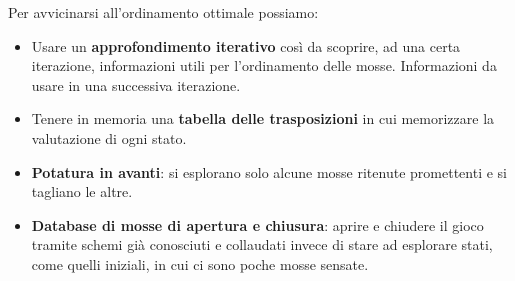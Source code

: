 Per avvicinarsi all'ordinamento ottimale possiamo:
\begin{itemize}
	\item Usare un \textbf{approfondimento iterativo} cos\`i da scoprire,
	      ad una certa iterazione, informazioni utili per l'ordinamento delle mosse. Informazioni da usare
	      in una successiva iterazione.
	\item Tenere in memoria una \textbf{tabella delle trasposizioni} in cui memorizzare la valutazione di ogni stato.
	\item \textbf{Potatura in avanti}: si esplorano solo alcune mosse ritenute promettenti e si tagliano le altre.
	\item \textbf{Database di mosse di apertura e chiusura}: aprire e chiudere il gioco tramite schemi gi\`a conosciuti
	      e collaudati invece di stare ad esplorare stati, come quelli iniziali, in cui ci sono poche mosse sensate.
\end{itemize}